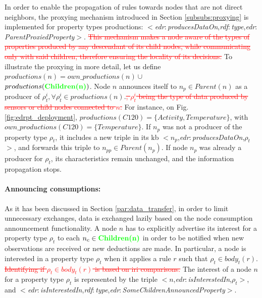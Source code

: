 \documentclass{iosart2c}
\newcommand{\added}[1]{\textcolor{green}{\textbf{#1}}}
\newcommand{\removed}[1]{\textcolor{red}{\sout{#1}}}
\newcommand{\namespace}[1]{\textit{#1$:$}}
\newcommand{\concept}[2]{\namespace{#1}\-\textit{#2}}
\newcommand{\triplet}[3]{$<$#1,\textit{#2},#3$>$}
\begin{document}
In order to enable the propagation of rules towards nodes that are not direct neighbors, the proxying mechanism introduced in Section \textsection \ref{subsubs:proxying} is implemented for property types productions: \triplet{\concept{edr}{produces\-Data\-On}}{\concept{rdf}{type}}{\concept{edr}{Parent\-Proxied\-Property}}.
\removed{This mechanism makes a node aware of the types of properties produced by any descendant of its child nodes, while communicating only with said children, therefore ensuring the locality of its decisions.}
To illustrate the proxying in more detail, let us define $productions(n)=own\_productions(n)\cup$\\$productions(\added{Children(n)})$. 
Node $n$ announces itself to $n_{p}\in Parent(n)$ as a producer of $\rho^{i}_t, \forall \rho^{i}_t\in productions(n)$.\removed{, $\rho^{i}_t$ being the type of data produced by sensors or child nodes connected to $n$.}
For instance, on Fig. \ref{fig:edrpt_deployment}, $productions(C120) = \{Activity, Temperature\}$, with\\$own\_productions(C120) = \{Temperature\}$.
If $n_{p}$ was not a producer of the property type $\rho_t$, it includes a new triple in its \gls{kb} \triplet{$n_{p}$}{\concept{edr}{produces\-Data\-On}}{$\rho_t$}, and forwards this triple to $n_{pp}\in Parent(n_p)$.
If node $n_{p}$ was already a producer for $\rho_t$, its characteristics remain unchanged, and the information propagation stops.

\paragraph{Announcing consumptions:}
As it has been discussed in Section \textsection \ref{par:data_transfer}, in order to limit unnecessary exchanges, data is exchanged lazily based on the node consumption announcement functionality.
A node $n$ has to explicitly advertise its interest for a property type $\rho_{t}$ to each $n_c\in \added{Children(n)}$ in order to be notified when new observations are received or new deductions are made. 
In particular, a node is interested in a property type $\rho_{t}$ when it applies a rule $r$ such that $\rho_{t}\in body_t(r)$. 
\removed{Identifying if $\rho_t \in body_t(r)$ is based on \gls{iri} comparisons.}
The interest of a node $n$ for a property type $\rho_t$ is represented by the triple \triplet{$n$}{\concept{edr}{is\-Interested\-In}}{$\rho_t$}, and \triplet{\concept{edr}{is\-Interested\-In}}{\concept{rdf}{type}}{\concept{edr}{Some\-Children\-Announced\-Property}}.
\end{document}
